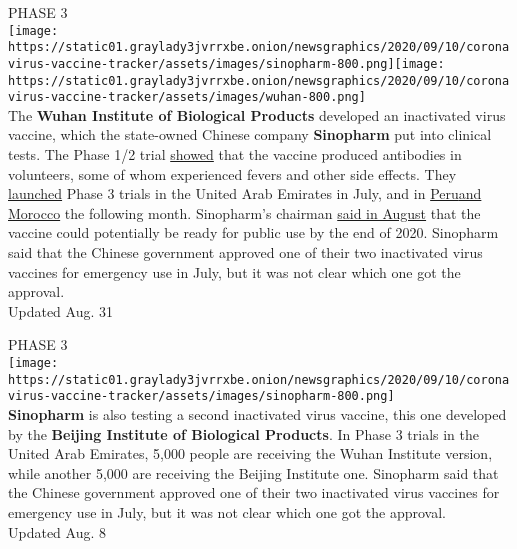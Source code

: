 PHASE 3\\
\texttt{[image: https://static01.graylady3jvrrxbe.onion/newsgraphics/2020/09/10/coronavirus-vaccine-tracker/assets/images/sinopharm-800.png]}\texttt{[image: https://static01.graylady3jvrrxbe.onion/newsgraphics/2020/09/10/coronavirus-vaccine-tracker/assets/images/wuhan-800.png]}\\
The \textbf{\textbf{Wuhan Institute of Biological Products}} developed
an inactivated virus vaccine, which the state-owned Chinese company
\textbf{\textbf{Sinopharm}} put into clinical tests. The Phase 1/2 trial
\href{https://jamanetwork.com/journals/jama/fullarticle/2769612}{showed}
that the vaccine produced antibodies in volunteers, some of whom
experienced fevers and other side effects. They
\href{https://www.thenational.ae/world/coronavirus-live-uk-accuses-russia-of-trying-to-steal-vaccine-research-1.1042256}{launched}
Phase 3 trials in the United Arab Emirates in July, and in
\href{https://www.reuters.com/article/us-health-coronavirus-vaccine-sinopharm/peru-morocco-to-test-china-sinopharms-covid-19-vaccine-in-phase-3-trial-idUSKCN25G0G9}{Peru}\href{https://www.reuters.com/article/us-health-coronavirus-vaccine-sinopharm/peru-morocco-to-test-china-sinopharms-covid-19-vaccine-in-phase-3-trial-idUSKCN25G0G9}{and
Morocco} the following month. Sinopharm's chairman
\href{https://www.nytimes3xbfgragh.onion/reuters/2020/08/18/world/europe/18reuters-health-coronavirus-vaccine-sinopharm.html}{said
in August} that the vaccine could potentially be ready for public use by
the end of 2020. Sinopharm said that the Chinese government approved one
of their two inactivated virus vaccines for emergency use in July, but
it was not clear which one got the approval.\\
Updated Aug. 31

PHASE 3\\
\texttt{[image: https://static01.graylady3jvrrxbe.onion/newsgraphics/2020/09/10/coronavirus-vaccine-tracker/assets/images/sinopharm-800.png]}\\
\textbf{\textbf{Sinopharm}} is also testing a second inactivated virus
vaccine, this one developed by the \textbf{\textbf{Beijing Institute of
Biological Products}}. In Phase 3 trials in the United Arab Emirates,
5,000 people are receiving the Wuhan Institute version, while another
5,000 are receiving the Beijing Institute one. Sinopharm said that the
Chinese government approved one of their two inactivated virus vaccines
for emergency use in July, but it was not clear which one got the
approval.\\
Updated Aug. 8


